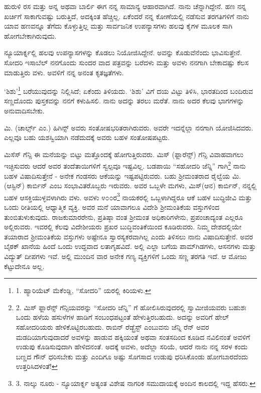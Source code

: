 ಹುರುಳಿ ರಸ ಮತ್ತು ಅನ್ನ ಅಥವಾ ಬಾರ್ಲಿ ಈಗ ನನ್ನ ಸಾಮಾನ್ಯ ಆಹಾರವಾಗಿದೆ. ನಾನು ಚೆನ್ನಾಗಿದ್ದೇನೆ. ಹಣ ನನ್ನ ಖರ್ಚಿಗೆ ಸಾಕಾಗುವಷ್ಟು ಬರುತ್ತಿದೆ, ಅದಕ್ಕಿಂತ ಹೆಚ್ಚಿಲ್ಲ. ಏಕೆಂದರೆ ನನ್ನ ಕೋಣೆಯಲ್ಲಿ ನಡೆಸುವ ತರಗತಿಗಳಿಗೆ ನಾನು ಯಾವ ಹಣವನ್ನೂ ತೆಗೆದು ಕೊಳ್ಳುತ್ತಿಲ್ಲ ಮತ್ತು ಸಾರ್ವಜನಿಕ ಉಪನ್ಯಾಸಗಳು ಹಲವು ಕೈಗಳ ಮೂಲಕ ಸಾಗಿ ಹೋಗಬೇಕಾಗಿರುವುದು.

ನ್ಯೂಯಾರ್ಕ್ನಲ್ಲಿ ಹಲವು ಉಪನ್ಯಾಸಗಳನ್ನು ಕೊಡಲು ನಿಯೋಜಿಸಿದ್ದೇನೆ. ಅವನ್ನು ಕೊಡುವೆನೆಂದು ಭಾವಿಸುತ್ತೇನೆ. ಸೋದರಿ ಇಸಾಬೆಲ್ ನನಗೊಂದು ಸುಂದರ ವಾದ ಪತ್ರವನ್ನು ಬರೆದಳು ಮತ್ತು ಅವಳು ನನಗಾಗಿ ಬೇಕಾದಷ್ಟು ಕೆಲಸ ಮಾಡುತ್ತಿರು ವಳು. ಅವಳಿಗೆ ನನ್ನ ಅನಂತ ಕೃತಜ್ಞತೆಗಳು.

‘ಶಿಶು’\footnote{1. ಹ್ಯಾರಿಯೆಟ್ ಮೆಕೆಂಡ್ಲಿ, “ಸೋದರಿ” ಯರಲ್ಲಿ ಕಿರಿಯಳು.} ಬರೆಯುವುದನ್ನು ನಿಲ್ಲಿಸಿದೆ; ಏಕೆಂದು ತಿಳಿಯದು. ‘ಶಿಶು’ ವಿಗೆ ದಯ ವಿಟ್ಟು ತಿಳಿಸಿ, ಭಾರತದಿಂದ ಬಂದಿರುವ ಸಣ್ಣದೊಂದು ಪುಸ್ತಕವನ್ನು ನನಗೆ ಕಳುಹಿಸಲಿ. ನಾನು ಅದನ್ನು ತರಲು ಮರೆತೆ. ನಾನು ಅದರ ಕೆಲವು ಭಾಗಗಳನ್ನು ಅನುವಾದಿಸಬೇಕು.

ಮಿ. (ಚಾರ್ಲ್ಸ್ ಎಂ.) ಹಿಗಿನ್ಸ್ ಅವರು ಸಂತೋಷಭರಿತರಾಗಿರುವರು. ಅವರೇ ಇದನ್ನೆಲ್ಲಾ ನನಗಾಗಿ ಯೋಜಿಸಿದವರು. ಎಲ್ಲವೂ ಬಹು ಯಶಸ್ವಿಯಾಗಿ ನಡೆದುದಕ್ಕೆ ಅವರು ಬಹಳ ಸಂತೋಷಪಟ್ಟರು.

ಮಿಸೆಸ್ ಗೆನ್ಸಿ ಈ ಮನೆಯನ್ನು ಬಿಟ್ಟು ಮತ್ತೊಂದಕ್ಕೆ ಹೋಗುತ್ತಿರುವರು. ಮಿಸ್ (ಫ್ಲಾರೆನ್ಸ್) ಗೆನ್ಸಿ ವಿವಾಹವಾಗಲು ಇಚ್ಛಿಸುವರು ಆದರೆ ಅವರ ತಂದೆತಾಯಿಗಳಿಗೆ ಸ್ವಲ್ಪವೂ ಇಷ್ಟವಿಲ್ಲ. ಬಡಪಾಯಿ “ಸಹೋದರಿ ಜೆನ್ನಿ” ಗಾಗಿ\footnote{2. ಮಿಸ್ ಫ್ಲಾರೆನ್ಸ್ ಗೆನ್ಸಿಯವರನ್ನು “ಸೋದರಿ ಜೆನ್ನಿ” ಗೆ ಹೋಲಿಸಿರುವುದರಲ್ಲಿ ಸ್ವಾಮೀಜಿಯವರು ಬಹುಶಃ ಒಂದು ಹಳೆಯ ಹಸುಳೆಗಳ ಹಾಡಿಗೆ ಸಂಬಂಧಪಟ್ಟಂತೆ ಹೇಳುತ್ತಿರಬಹುದು. ಅದನ್ನು ಅವರಿಗೆ ಹೇಲ್ ಸಹೋದರಿಯರು ಹೇಳಿಕೊಟ್ಟಿರಬಹುದು. ರಾಬಿನ್ ರೆಡ್ಬ್ರೆಸ್ಟ್ ಎಂಬುವನು ಜೆನ್ನಿ ರೆನ್ ಅವರ ಮಡದಿಯಾಗುವುದಾದರೆ ಅವಳನ್ನು ಹಾಡುವ ಹಕ್ಕಿಯಂತೆ ಅಥವಾ ಸಂತಸದಿಂದ ಕೂಡಿದ ನವಿಲಿನಂತೆ ಅವಳಿಗೆ ಉಡುಪು ಕೊಡಿಸುವುದಾಗಿ ಹೇಳಿದನಂತೆ. ಅದಕ್ಕೆ ಅವಳು, ಅದೆಲ್ಲಾ ಸರಿಯೆ, ಆದರೆ ನಾನು ನನ್ನ ಸರಳ ಕಂದು ಬಣ್ಣದ ಗೌನ್ ಧರಿಸಬೇಕು ಮತ್ತು ಎಂದಿಗೂ ಅಷ್ಟು ಸೊಗಸಾದ ಉಡುಪು ಧರಿಸಿಕೊಂಡು ಹೋಗಬಾರದೆಂದು ಉತ್ತರಿಸಿದಳಂತೆ!} ನಾನು ಬಹಳ ವಿಷಾದಿಸುತ್ತೇನೆ - ಅನೇಕ ಗಂಡಸರು ಆಕೆಯನ್ನು ಇಷ್ಟಪಟ್ಟಿರುವರು. ಬಹು ಶ‍್ರೀಮಂತರಾದ ರೈಲ್ವೆಯ ಮಿ. (ಆಸ್ಟಿನ್) ಕಾರ್ಬಿನ್ ಎಂಬ ಸಂಭಾವಿತರೊಬ್ಬರು ಇರುವರು. ಅವರ ಒಬ್ಬಳೇ ಮಗಳು, ಮಿಸ್(ಆನ) ಕಾರ್ಬಿನ್, ನನ್ನಲ್ಲಿ ಬಹಳ ಆಸಕ್ತಿಯುಳ್ಳವಳಾಗಿರು ವಳು. ಅವಳು ೪೦೦ರ\footnote{3. ನಾಲ್ಕು ನೂರು - ನ್ಯೂಯಾರ್ಕ್ನ ಅತ್ಯಂತ ವಿಶೇಷ ನಾಗರಿಕ ಸಮುದಾಯಕ್ಕೆ ಅಂದಿನ ಕಾಲದಲ್ಲಿ ಇದ್ದ ಹೆಸರು.} ನಾಯಕರಲ್ಲಿ ಒಬ್ಬಳಾಗಿದ್ದರೂ ಆಕೆ ಬಹಳ ಬುದ್ಧಿಜೀವಿ ಮತ್ತು ಒಂದು ರೀತಿಯಲ್ಲಿ ಆಧ್ಯಾತ್ಮಿಕ ವ್ಯಕ್ತಿ. ಅವರ ಮನೆ ಯಾವಾಗಲೂ ವಿದೇಶಿ ಶ‍್ರೀಮಂತಿಕೆಯ ವಸ್ತುಗಳಿಂದ ತುಂಬಿತುಳುಕುವುದು. ರಾಜಕುಮಾರರೇನು, ಪ್ರತಿಷ್ಠಾ ವಂತ ಶ‍್ರೀಮಂತ ಅಧಿಕಾರಿಗಳೇನು, ಪ್ರಪಂಚಾದ್ಯಂತ ಎಲ್ಲರೂ ಅಲ್ಲಿರುವರು. ಇವರಲ್ಲಿ ಕೆಲವು ವಿದೇಶೀಯರು ಪ್ರಖರ ಬುದ್ಧಿವಂತಿಕೆಯಿಂದ ಕೂಡಿರುವರು. ನಿಮ್ಮ ದೇಶದಲ್ಲಿಯೇ ತಯಾರಾದ ಶ‍್ರೀಮಂತಿಕೆಯ ವಸ್ತುಗಳು ಅಷ್ಟೇನೂ ಸ್ವಾರಸ್ಯಕರವಾಗಿಲ್ಲ ಎಂದು ತಿಳಿಸಲು ನಾನು ವಿಷಾದಿಸುತ್ತೇನೆ. ಅವರ ಬೈಠಕ್ ಖಾನೆಯ ಹಿಂದೆ ಒಂದು ಉದ್ದವಾದ ಲತಾಗೃಹವಿದೆ. ಅಲ್ಲಿ ಎಲ್ಲಾ ಬಗೆಯ ಪಾಮ್​ ಗಿಡಗಳು, ಆಸನಗಳು ಮತ್ತು ವಿದ್ಯುತ್ ದೀಪಗಳು ಇವೆ. ಅಲ್ಲಿ ಮುಂದಿನ ವಾರ ಅನೇಕ ಗಣ್ಯ ವ್ಯಕ್ತಿಗಳಿಗೆ ಒಂದು ಸಣ್ಣ ತರಗತಿ ಇದೆ. ಆ ಮೋಜು ಕೆಟ್ಟುದೇನೂ ಅಲ್ಲ.

